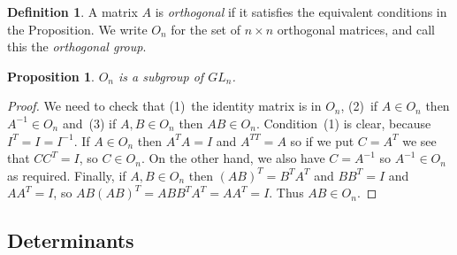 \documentclass{amsart}
\newcommand{\tm}        {\times}
\renewcommand{\:}{\colon}
\newtheorem{proposition}[theorem]{Proposition}
\theoremstyle{definition}
\newtheorem{definition}[theorem]{Definition}
\begin{document}
\begin{definition}
 A matrix $A$ is \emph{orthogonal} if it satisfies the equivalent
 conditions in the Proposition.  We write $O_n$ for the set of
 $n\tm n$ orthogonal matrices, and call this the \emph{orthogonal
 group}.
\end{definition}
\begin{proposition}\label{prop-On-subgroup}
 $O_n$ is a subgroup of $GL_n$.
\end{proposition}
\begin{proof}
 We need to check that (1)~the identity matrix is in $O_n$, (2)~if
 $A\in O_n$ then $A^{-1}\in O_n$ and~(3) if $A,B\in O_n$ then
 $AB\in O_n$.  Condition~(1) is clear, because $I^T=I=I^{-1}$.  If
 $A\in O_n$ then $A^TA=I$ and $A^{TT}=A$ so if we put $C=A^T$ we see
 that $CC^T=I$, so $C\in O_n$.  On the other hand, we also have
 $C=A^{-1}$ so $A^{-1}\in O_n$ as required.  Finally, if $A,B\in O_n$
 then $(AB)^T=B^TA^T$ and $BB^T=I$ and $AA^T=I$, so
 $AB(AB)^T=ABB^TA^T=AA^T=I$.  Thus $AB\in O_n$.
\end{proof}

\subsection{Determinants}
\end{document}
